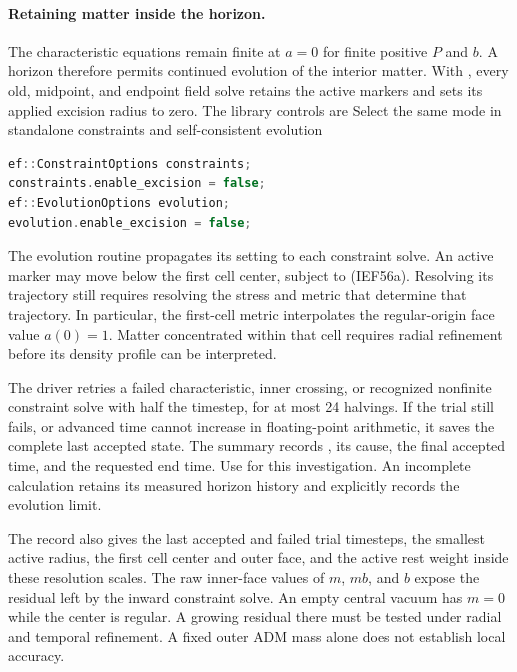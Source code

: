 \paragraph{Retaining matter inside the horizon.}
\label{sec:ef-interior-evolution}
The characteristic equations remain finite at \(a=0\) for finite positive
\(P\) and \(b\). A horizon therefore permits continued evolution of the
interior matter. With , every old, midpoint, and
endpoint field solve retains the active markers and sets its applied
excision radius to zero. The library controls are
{}
{Select the same mode in standalone constraints and self-consistent evolution}
\begin{lstlisting}[language=C++]
ef::ConstraintOptions constraints;
constraints.enable_excision = false;
ef::EvolutionOptions evolution;
evolution.enable_excision = false;
\end{lstlisting}
The evolution routine propagates its setting to each constraint solve.
An active marker may move below the first cell center, subject to (IEF56a).
Resolving its trajectory still requires resolving the stress and metric that
determine that trajectory. In particular, the first-cell metric interpolates
the regular-origin face value \(a(0)=1\). Matter concentrated within that
cell requires radial refinement before its density profile can be interpreted.

The driver retries a failed characteristic, inner crossing, or recognized
nonfinite constraint solve with half the timestep, for at most 24 halvings.
If the trial still fails, or advanced time cannot increase in floating-point
arithmetic, it saves the complete last accepted state. The summary records
, its cause, the final accepted time,
and the requested end time. Use  for this
investigation. An incomplete calculation retains its measured horizon
history and explicitly records the evolution limit.

The  record also gives the last accepted and
failed trial timesteps, the smallest active radius, the first cell center
and outer face, and the active rest weight inside these resolution scales.
The raw inner-face values of \(m\), \(mb\), and \(b\) expose the residual
left by the inward constraint solve. An empty central vacuum has \(m=0\)
while the center is regular. A growing residual there must be tested under
radial and temporal refinement. A fixed outer ADM mass alone does not
establish local accuracy.


